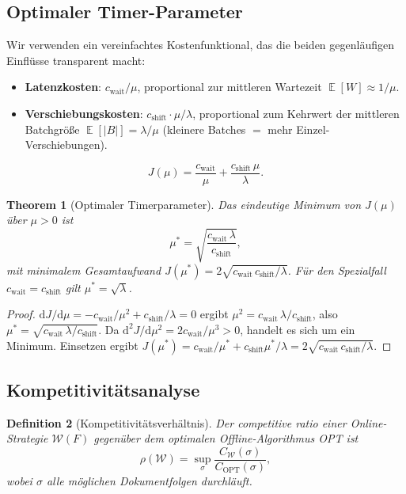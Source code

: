 ﻿\documentclass[12pt, a4paper]{article}
\newtheorem{theorem}{Theorem}[section]
\newtheorem{definition}[theorem]{Definition}
\DeclareMathOperator{\E}{\mathbb{E}}
\begin{document}
\subsection{Optimaler Timer-Parameter}\label{subsec:optparam}

Wir verwenden ein vereinfachtes Kostenfunktional, das die beiden
gegenläufigen Einflüsse transparent macht:
\begin{itemize}[noitemsep]
  \item \textbf{Latenzkosten}: $c_{\mathrm{wait}}/\mu$, proportional zur
        mittleren Wartezeit $\E[W] \approx 1/\mu$.
  \item \textbf{Verschiebungskosten}: $c_{\mathrm{shift}} \cdot \mu/\lambda$,
        proportional zum Kehrwert der mittleren Batchgröße
        $\E[|B|] = \lambda/\mu$ (kleinere Batches $=$ mehr Einzel-Verschiebungen).
\end{itemize}
\[
  J(\mu) = \frac{c_{\mathrm{wait}}}{\mu} + \frac{c_{\mathrm{shift}}\,\mu}{\lambda}.
\]

\begin{theorem}[Optimaler Timerparameter]\label{thm:optmu}
Das eindeutige Minimum von $J(\mu)$ über $\mu > 0$ ist
\[
  \mu^* = \sqrt{\frac{c_{\mathrm{wait}}\,\lambda}{c_{\mathrm{shift}}}},
\]
mit minimalem Gesamtaufwand $J(\mu^*) = 2\sqrt{c_{\mathrm{wait}}\,c_{\mathrm{shift}}/\lambda}$.
Für den Spezialfall $c_{\mathrm{wait}} = c_{\mathrm{shift}}$ gilt $\mu^* = \sqrt{\lambda}$.
\end{theorem}

\begin{proof}
$\mathrm{d}J/\mathrm{d}\mu = -c_{\mathrm{wait}}/\mu^2 + c_{\mathrm{shift}}/\lambda = 0$
ergibt $\mu^2 = c_{\mathrm{wait}}\,\lambda/c_{\mathrm{shift}}$, also
$\mu^* = \sqrt{c_{\mathrm{wait}}\,\lambda/c_{\mathrm{shift}}}$.
Da $\mathrm{d}^2J/\mathrm{d}\mu^2 = 2c_{\mathrm{wait}}/\mu^3 > 0$, handelt es sich um ein Minimum.
Einsetzen ergibt $J(\mu^*) = c_{\mathrm{wait}}/\mu^* + c_{\mathrm{shift}}\mu^*/\lambda = 2\sqrt{c_{\mathrm{wait}}\,c_{\mathrm{shift}}/\lambda}$.
\end{proof}

\subsection{Kompetitivitätsanalyse}\label{subsec:competitive}

\begin{definition}[Kompetitivitätsverhältnis]\label{def:competitive}
Der \emph{competitive ratio} einer Online-Strategie $\mathcal{W}(F)$ gegenüber
dem optimalen Offline-Algorithmus OPT ist
\[
  \rho(\mathcal{W}) = \sup_\sigma \frac{C_{\mathcal{W}}(\sigma)}{C_{\mathrm{OPT}}(\sigma)},
\]
wobei $\sigma$ alle möglichen Dokumentfolgen durchläuft.
\end{definition}
\end{document}
